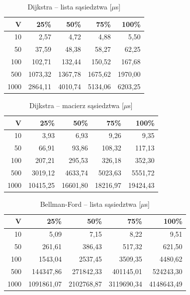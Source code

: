 \documentclass[12pt,a4paper]{article}
\begin{document}
\begin{table}[H]
\centering
\caption{Dijkstra -- lista sąsiedztwa [$\mu$s]}
\begin{tabular}{rrrrr}
\toprule
\textbf{V} & \textbf{25\%} & \textbf{50\%} & \textbf{75\%} & \textbf{100\%} \\
\midrule
10   & 2,57    & 4,72    & 4,88    & 5,50    \\
50   & 37,59   & 48,38   & 58,27   & 62,25   \\
100  & 102,71  & 132,44  & 150,52  & 167,68  \\
500  & 1073,32 & 1367,78 & 1675,62 & 1970,00 \\
1000 & 2864,11 & 4010,74 & 5134,06 & 6203,25 \\
\bottomrule
\end{tabular}
\end{table}
 
\begin{table}[H]
\centering
\caption{Dijkstra -- macierz sąsiedztwa [$\mu$s]}
\begin{tabular}{rrrrr}
\toprule
\textbf{V} & \textbf{25\%} & \textbf{50\%} & \textbf{75\%} & \textbf{100\%} \\
\midrule
10   & 3,93     & 6,93     & 9,26     & 9,35     \\
50   & 66,91    & 93,86    & 108,32   & 117,13   \\
100  & 207,21   & 295,53   & 326,18   & 352,30   \\
500  & 3019,12  & 4633,74  & 5023,63  & 5551,72  \\
1000 & 10415,25 & 16601,80 & 18216,97 & 19424,43 \\
\bottomrule
\end{tabular}
\end{table}
 
\begin{table}[H]
\centering
\caption{Bellman-Ford -- lista sąsiedztwa [$\mu$s]}
\begin{tabular}{rrrrr}
\toprule
\textbf{V} & \textbf{25\%} & \textbf{50\%} & \textbf{75\%} & \textbf{100\%} \\
\midrule
10   & 5,09       & 7,15       & 8,22       & 9,51       \\
50   & 261,61     & 386,43     & 517,32     & 621,50     \\
100  & 1543,04    & 2537,45    & 3509,35    & 4480,62    \\
500  & 144347,86  & 271842,33  & 401145,01  & 524243,30  \\
1000 & 1091861,07 & 2102768,87 & 3119690,34 & 4148643,49 \\
\bottomrule
\end{tabular}
\end{table}
 
\end{document}
